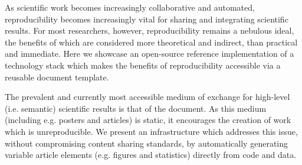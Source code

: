 As scientific work becomes increasingly collaborative and automated, reproducibility becomes increasingly vital for sharing and integrating scientific results.
For most researchers, however, reproducibility remains a nebulous ideal, the benefits of which are considered more theoretical and indirect, than practical and immediate.
Here we showcase an open-source reference implementation of a technology stack which makes the benefits of reproducibility accessible via a reusable document template.

\vspace{.8em}

The prevalent and currently most accessible medium of exchange for high-level (i.e. semantic) scientific results is that of the document.
As this medium (including e.g. posters and articles) is static, it encourages the creation of work which is unreproducible.
We present an infrastructure which addresses this issue, without compromising content sharing standards, by automatically generating variable article elements (e.g. figures and statistics) directly from code and data.
